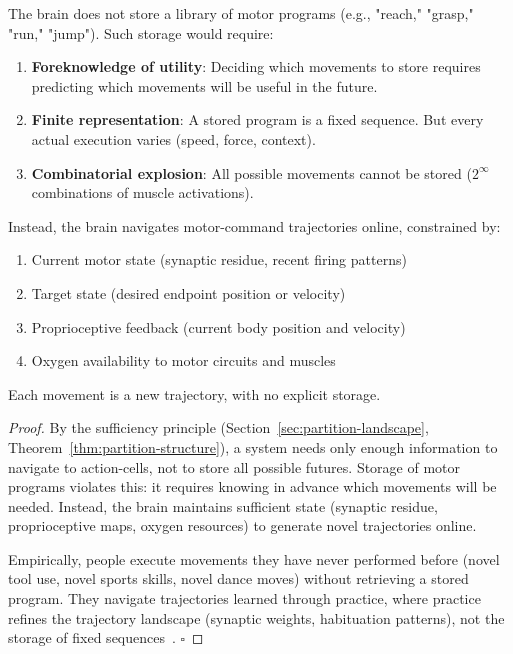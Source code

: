 \begin{theorem}
\label{thm:no-motor-storage}
The brain does not store a library of motor programs (e.g., "reach," "grasp," "run," "jump"). Such storage would require:
\begin{enumerate}[label=(\roman*), noitemsep]
\item \textbf{Foreknowledge of utility}: Deciding which movements to store requires predicting which movements will be useful in the future.
\item \textbf{Finite representation}: A stored program is a fixed sequence. But every actual execution varies (speed, force, context).
\item \textbf{Combinatorial explosion}: All possible movements cannot be stored ($2^{\infty}$ combinations of muscle activations).
\end{enumerate}

Instead, the brain navigates motor-command trajectories online, constrained by:
\begin{enumerate}[label=(\arabic*), noitemsep]
\item Current motor state (synaptic residue, recent firing patterns)
\item Target state (desired endpoint position or velocity)
\item Proprioceptive feedback (current body position and velocity)
\item Oxygen availability to motor circuits and muscles
\end{enumerate}

Each movement is a new trajectory, with no explicit storage.
\end{theorem}

\begin{proof}
By the sufficiency principle (Section~\ref{sec:partition-landscape}, Theorem~\ref{thm:partition-structure}), a system needs only enough information to navigate to action-cells, not to store all possible futures. Storage of motor programs violates this: it requires knowing in advance which movements will be needed. Instead, the brain maintains sufficient state (synaptic residue, proprioceptive maps, oxygen resources) to generate novel trajectories online.

Empirically, people execute movements they have never performed before (novel tool use, novel sports skills, novel dance moves) without retrieving a stored program. They navigate trajectories learned through practice, where practice refines the trajectory landscape (synaptic weights, habituation patterns), not the storage of fixed sequences~\cite{Doyon2009,WolpertWolpert1998}. $\square$
\end{proof}

